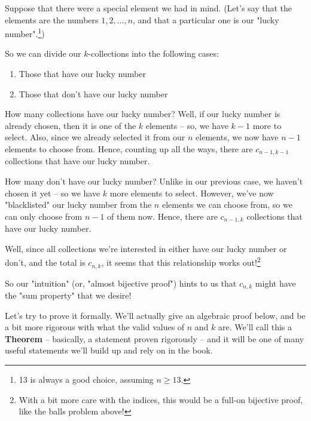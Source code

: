 Suppose that there were a special element we had in mind. (Let's say that the elements are the numbers $1, 2, ..., n$, and that a particular one is our "lucky number".\footnote{13 is always a good choice, assuming $n \geq 13$.})

So we can divide our $k$-collections into the following cases:

\begin{enumerate}
\item Those that have our lucky number
\item Those that don't have our lucky number
\end{enumerate}

How many collections have our lucky number? Well, if our lucky number is already chosen, then it is one of the $k$ elements -- so, we have $k-1$ more to select. Also, since we already selected it from our $n$ elements, we now have $n-1$ elements to choose from. Hence, counting up all the ways, there are $c_{n-1,k-1}$ collections that have our lucky number.

How many don't have our lucky number? Unlike in our previous case, we haven't chosen it yet -- so we have $k$ more elements to select. However, we've now "blacklisted" our lucky number from the $n$ elements we can choose from, so we can only choose from $n-1$ of them now. Hence, there are $c_{n-1,k}$ collections that have our lucky number.

Well, since all collections we're interested in either have our lucky number or don't, and the total is $c_{n,k}$, it seems that this relationship works out!\footnote{With a bit more care with the indices, this would be a full-on bijective proof, like the balls problem above!}

So our "intuition" (or, "almost bijective proof") hints to us that $c_{n,k}$ might have the "sum property" that we desire!

Let's try to prove it formally. We'll actually give an algebraic proof below, and be a bit more rigorous with what the valid values of $n$ and $k$ are. We'll call this a \textbf{Theorem} -- basically, a statement proven rigorously -- and it will be one of many useful statements we'll build up and rely on in the book.



